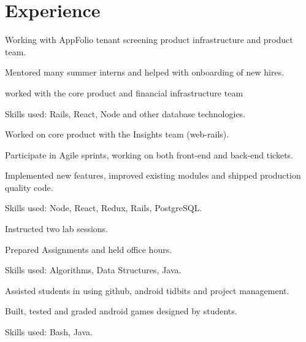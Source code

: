 \section{Experience}

    \vspace{\topsep}
    \begin{tightemize}
      \item Working with AppFolio tenant screening product infrastructure and product team.
      \item Mentored many summer interns and helped with onboarding of new hires.
      \item worked with the core product and financial infrastructure team
      \item Skills used: Rails, React, Node and other database technologies.
    \end{tightemize}
    \sectionsep

    \vspace{\topsep}
    \begin{tightemize}
      \item Worked on core product with the Insights team (web-rails).
      \item Participate in Agile sprints, working on both front-end and back-end tickets.
      \item Implemented new features, improved existing modules and shipped production quality code.
      \item Skills used: Node, React, Redux, Rails, PostgreSQL.
    \end{tightemize}
    \sectionsep

    \begin{tightemize}
      \item Instructed two lab sessions.
      \item Prepared Assignments and held office hours.
      \item Skills used: Algorithms, Data Structures, Java.
    \end{tightemize}
    \sectionsep

    \begin{tightemize}
      \item Assisted students in using github, android tidbits and project management.
      \item Built, tested and graded android games designed by students.
      \item Skills used: Bash, Java.
    \end{tightemize}
    \sectionsep

